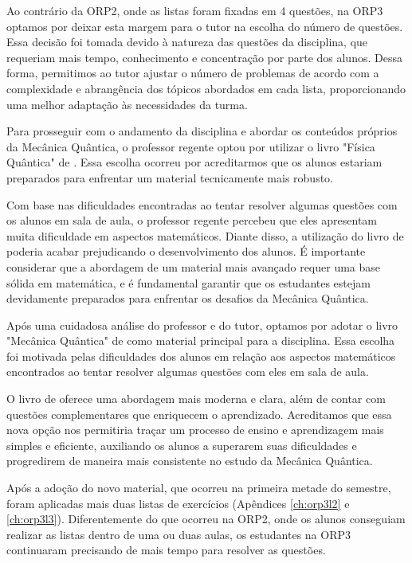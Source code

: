 Ao contrário da ORP2, onde as listas foram fixadas em 4 questões, na ORP3 optamos por deixar esta margem para o tutor na escolha do número de questões. Essa decisão foi tomada devido à natureza das questões da disciplina, que requeriam mais tempo, conhecimento e concentração por parte dos alunos. Dessa forma, permitimos ao tutor ajustar o número de problemas de acordo com a complexidade e abrangência dos tópicos abordados em cada lista, proporcionando uma melhor adaptação às necessidades da turma.

Para prosseguir com o andamento da disciplina e abordar os conteúdos próprios da Mecânica Quântica, o professor regente optou por utilizar o livro "Física Quântica" de . Essa escolha ocorreu por acreditarmos que os alunos estariam preparados para enfrentar um material tecnicamente mais robusto.


Com base nas dificuldades encontradas ao tentar resolver algumas questões com os alunos em sala de aula, o professor regente percebeu que eles apresentam muita dificuldade em aspectos matemáticos. Diante disso, a utilização do livro de  poderia acabar prejudicando o desenvolvimento dos alunos. É importante considerar que a abordagem de um material mais avançado requer uma base sólida em matemática, e é fundamental garantir que os estudantes estejam devidamente preparados para enfrentar os desafios da Mecânica Quântica.

Após uma cuidadosa análise do professor e do tutor, optamos por adotar o livro "Mecânica Quântica" de  como material principal para a disciplina. Essa escolha foi motivada pelas dificuldades dos alunos em relação aos aspectos matemáticos encontrados ao tentar resolver algumas questões com eles em sala de aula.

O livro de  oferece uma abordagem mais moderna e clara, além de contar com questões complementares que enriquecem o aprendizado. Acreditamos que essa nova opção nos permitiria traçar um processo de ensino e aprendizagem mais simples e eficiente, auxiliando os alunos a superarem suas dificuldades e progredirem de maneira mais consistente no estudo da Mecânica Quântica.

Após a adoção do novo material, que ocorreu na primeira metade do semestre, foram aplicadas mais duas listas de exercícios (Apêndices \ref{ch:orp3l2} e \ref{ch:orp3l3}). Diferentemente do que ocorreu na ORP2, onde os alunos conseguiam realizar as listas dentro de uma ou duas aulas, os estudantes na ORP3 continuaram precisando de mais tempo para resolver as questões.

